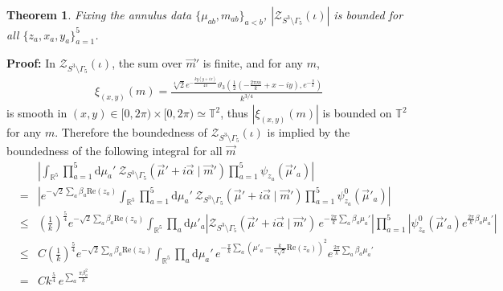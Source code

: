 \documentclass[aps,prd,notitlepage,nofootinbib,superscriptaddress,groupedaddress,twocolumn]{revtex4-1}
\def\R{\mathbb{R}}
\newtheorem{theorem}{Theorem}[section]
\def\be{\begin{eqnarray}}
\def\ee{\end{eqnarray}}
\newcommand{\cz}{\mathcal Z}
\renewcommand{\a}{\alpha}
\renewcommand{\b}{\beta}
\newcommand{\G}{\Gamma}
\newcommand{\rmd}{\mathrm d}
\newcommand{\lt}{\left}
\newcommand{\rt}{\right}
\begin{document}
\begin{widetext}
\begin{theorem}\label{finitevertex}
Fixing the annulus data $\{\mu_{ab},m_{ab}\}_{a<b}$, $|\cz_{S^3\setminus\G_5}(\iota)|$ is bounded for all $\{z_a,x_a,y_a\}_{a=1}^5$.
\end{theorem}

\textbf{Proof:} %
In $\cz_{S^3\setminus\G_5}(\iota)$, the sum over $\vec{m}'$ is finite, and for any $m$,
\be
\xi_{(x,y)}(m)=\frac{\sqrt[4]{2} e^{-\frac{k y (y+i x)}{4 \pi }} \vartheta _3\left(\frac{1}{2} \left(-\frac{2 \pi  m}{k}+x-i y\right),e^{-\frac{\pi }{k}}\right)}{k^{3/4}}\nonumber
\ee
is smooth in $(x,y)\in[0,2\pi)\times[0,2\pi)\simeq \mathbb{T}^2$, thus $|\xi_{(x,y)}(m)|$ is bounded on $\mathbb{T}^2$ for any $m$. Therefore the boundedness of $\cz_{S^3\setminus\G_5}(\iota)$ is implied by the boundedness of the following integral for all $\vec{m}$
\be
&&\lt|\int_{\R^{5}}\prod_{a=1}^5\rmd \mu_a'\ \cz_{S^3\setminus\G_5}(\vec{\mu}'+i\vec{\a}\mid \vec{m}')\prod_{a=1}^5\psi_{z_a}(\vec{\mu}'_a)\rt|\nonumber\\
&=&\lt|e^{-\sqrt{2}\sum_a\b_a\mathrm{Re}(z_a)}\int_{\R^{5}}\prod_{a=1}^5\rmd \mu_a'\ \cz_{S^3\setminus\G_5}(\vec{\mu}'+i\vec{\a}\mid \vec{m}')\prod_{a=1}^5\psi^0_{z_a}(\vec{\mu}'_a)\rt|\nonumber\\
&\leq&\lt(\frac{1}{k}\rt)^{\frac{5}{4}}e^{-\sqrt{2}\sum_a\b_a\mathrm{Re}(z_a)}\int_{\R^{5}}\prod_{a}\rmd \mu'_a\lt| \cz_{S^3\setminus\G_5}(\vec{\mu}'+i\vec{\a}\mid \vec{m}')\,e^{-\frac{2\pi}{k}\sum_a\b_a\mu_a'}\rt|\prod_{a=1}^5\lt|\psi_{z_a}^0(\vec{\mu}'_a)e^{\frac{2\pi}{k}\b_a\mu_a'}\rt|\nonumber\\
&\leq& C\lt(\frac{1}{k}\rt)^{\frac{5}{4}}e^{-\sqrt{2}\sum_a\b_a\mathrm{Re}(z_a)}\int_{\R^{5}}\prod_{a}\rmd \mu_a'\,e^{-\frac{\pi}{k}\sum_{a}\lt(\mu'_a-\frac{k}{\pi\sqrt{2}}\mathrm{Re}(z_a)\rt)^2}e^{\frac{2\pi}{k}\sum_a\b_a\mu_a'}\nonumber\\
&=&Ck^{\frac{5}{4}}\,e^{\sum_a\frac{\pi  \beta_a^2 }{k}}\label{upperboundcz}
\ee
\end{widetext}
\end{document}
